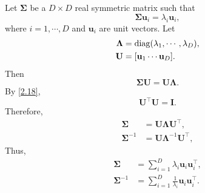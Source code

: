 \subsection{}
\label{2.19}
Let $\bm{\Sigma}$ be a $D \times D$ real symmetric matrix such that
%
\begin{equation}
\bm{\Sigma} 
\mathbf{u}_i 
= 
\lambda_i 
\mathbf{u}_i,
\end{equation}
%
where $i = 1, \cdots, D$ and $\mathbf{u}_i$ are unit vectors.
Let 
%
\begin{equation}
\begin{aligned}
\bm{\Lambda}
&= 
\operatorname{diag} (\lambda_1, \cdots, \lambda_D), 
\\
\mathbf{U} 
&= 
[\mathbf{u}_1 \cdots \mathbf{u}_D].
\end{aligned}
\end{equation}
%
Then
%
\begin{equation}
\bm{\Sigma} 
\mathbf{U}
= 
\mathbf{U} 
\bm{\Lambda}.
\end{equation}
%
By \ref{2.18}, 
%
\begin{equation}
\mathbf{U} ^ \intercal 
\mathbf{U} 
= 
\mathbf{I}.
\end{equation}
%
Therefore,
%
\begin{equation}
\begin{aligned}
\bm{\Sigma}
&= 
\mathbf{U} 
\bm{\Lambda} 
\mathbf{U} ^ \intercal, 
\\
\bm{\Sigma} ^ {- 1}
&= 
\mathbf{U} 
\bm{\Lambda} ^ {- 1} 
\mathbf{U} ^ \intercal,
\end{aligned}
\end{equation}
%
Thus,
%
\begin{equation}
\begin{aligned}
\bm{\Sigma}
&= 
\sum_{i = 1}^{D} 
\lambda_i 
\mathbf{u}_i 
\mathbf{u}_i ^ \intercal, \\
\bm{\Sigma} ^ {- 1}
&= 
\sum_{i = 1}^{D} 
\frac{1}{\lambda_i} 
\mathbf{u}_i 
\mathbf{u}_i ^ \intercal.
\end{aligned}
\end{equation}
%


